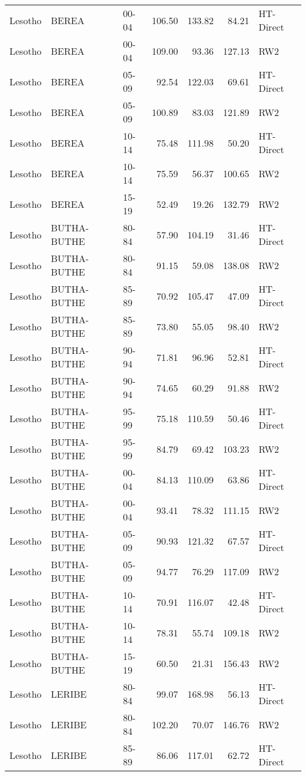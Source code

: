 \begin{longtable}{lllrrrl}
  Lesotho & BEREA & 00-04 & 106.50 & 133.82 & 84.21 & HT-Direct \\ 
  Lesotho & BEREA & 00-04 & 109.00 & 93.36 & 127.13 & RW2 \\ 
  Lesotho & BEREA & 05-09 & 92.54 & 122.03 & 69.61 & HT-Direct \\ 
  Lesotho & BEREA & 05-09 & 100.89 & 83.03 & 121.89 & RW2 \\ 
  Lesotho & BEREA & 10-14 & 75.48 & 111.98 & 50.20 & HT-Direct \\ 
  Lesotho & BEREA & 10-14 & 75.59 & 56.37 & 100.65 & RW2 \\ 
  Lesotho & BEREA & 15-19 & 52.49 & 19.26 & 132.79 & RW2 \\ 
  Lesotho & BUTHA-BUTHE & 80-84 & 57.90 & 104.19 & 31.46 & HT-Direct \\ 
  Lesotho & BUTHA-BUTHE & 80-84 & 91.15 & 59.08 & 138.08 & RW2 \\ 
  Lesotho & BUTHA-BUTHE & 85-89 & 70.92 & 105.47 & 47.09 & HT-Direct \\ 
  Lesotho & BUTHA-BUTHE & 85-89 & 73.80 & 55.05 & 98.40 & RW2 \\ 
  Lesotho & BUTHA-BUTHE & 90-94 & 71.81 & 96.96 & 52.81 & HT-Direct \\ 
  Lesotho & BUTHA-BUTHE & 90-94 & 74.65 & 60.29 & 91.88 & RW2 \\ 
  Lesotho & BUTHA-BUTHE & 95-99 & 75.18 & 110.59 & 50.46 & HT-Direct \\ 
  Lesotho & BUTHA-BUTHE & 95-99 & 84.79 & 69.42 & 103.23 & RW2 \\ 
  Lesotho & BUTHA-BUTHE & 00-04 & 84.13 & 110.09 & 63.86 & HT-Direct \\ 
  Lesotho & BUTHA-BUTHE & 00-04 & 93.41 & 78.32 & 111.15 & RW2 \\ 
  Lesotho & BUTHA-BUTHE & 05-09 & 90.93 & 121.32 & 67.57 & HT-Direct \\ 
  Lesotho & BUTHA-BUTHE & 05-09 & 94.77 & 76.29 & 117.09 & RW2 \\ 
  Lesotho & BUTHA-BUTHE & 10-14 & 70.91 & 116.07 & 42.48 & HT-Direct \\ 
  Lesotho & BUTHA-BUTHE & 10-14 & 78.31 & 55.74 & 109.18 & RW2 \\ 
  Lesotho & BUTHA-BUTHE & 15-19 & 60.50 & 21.31 & 156.43 & RW2 \\ 
  Lesotho & LERIBE & 80-84 & 99.07 & 168.98 & 56.13 & HT-Direct \\ 
  Lesotho & LERIBE & 80-84 & 102.20 & 70.07 & 146.76 & RW2 \\ 
  Lesotho & LERIBE & 85-89 & 86.06 & 117.01 & 62.72 & HT-Direct \\ 

\end{longtable}
